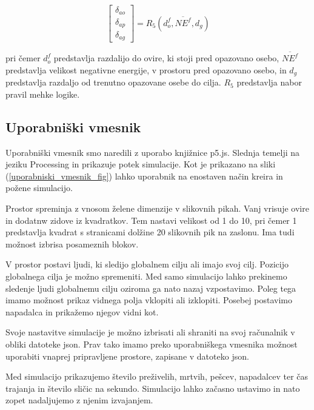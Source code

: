 \documentclass[9pt]{pnas-new}
\begin{document}
\begin{equation}
\label{delta_equation}
\begin{bmatrix}
\delta_{ao}\\
\delta_{ap}\\
\delta_{ag}
\end{bmatrix} = R_{5} (d_{o}^f, \overline{NE^f}, d_{g})
\end{equation}

\noindent pri čemer ${d_{o}^f}$ predstavlja razdalijo do ovire, ki stoji pred opazovano osebo, ${\overline{NE^f}}$ predstavlja velikost negativne energije, v prostoru pred opazovano osebo, in ${d_{g}}$ predstavlja razdaljo od trenutno opazovane osebe do cilja. ${R_{5}}$ predstavlja nabor pravil mehke logike. 

\subsection*{Uporabniški vmesnik}
Uporabniški vmesnik smo naredili z uporabo knjižnice p5.js. Slednja temelji na jeziku Processing in prikazuje potek simulacije. Kot je prikazano na sliki (\ref{uporabniski_vmesnik_fig}) lahko uporabnik na enostaven način kreira in požene simulacijo.

Prostor spreminja z vnosom želene dimenzije v slikovnih pikah. Vanj vrisuje ovire in dodatnw zidove iz kvadratkov. Tem nastavi velikost od 1 do 10, pri čemer 1 predstavlja kvadrat s stranicami dolžine 20 slikovnih pik na zaslonu. Ima tudi možnost izbrisa posameznih blokov. 

V prostor postavi ljudi, ki sledijo globalnem cilju ali imajo svoj cilj. Pozicijo globalnega cilja je možno spremeniti. Med samo simulacijo lahko prekinemo sledenje ljudi globalnemu cilju oziroma ga nato nazaj vzpostavimo. Poleg tega imamo možnost prikaz vidnega polja vklopiti ali izklopiti. Posebej postavimo napadalca in prikažemo njegov vidni kot.

Svoje nastavitve simulacije je možno izbrisati ali shraniti na svoj računalnik v obliki datoteke json. Prav tako imamo preko uporabniškega vmesnika možnost uporabiti vnaprej pripravljene prostore, zapisane v datoteko json.

Med simulacijo prikazujemo število preživelih, mrtvih, pešcev, napadalcev ter čas trajanja in število sličic na sekundo. Simulacijo lahko začasno ustavimo in nato zopet nadaljujemo z njenim izvajanjem.
\end{document}
